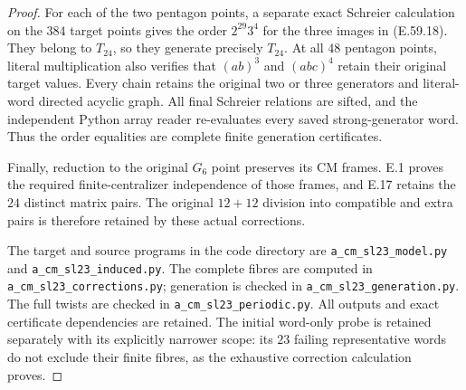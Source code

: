 \begin{proof}
For each of the two pentagon points, a separate exact Schreier
calculation on the $384$ target points gives the order
$2^{29}3^4$ for the three images in \textup{(E.59.18)}.
They belong to $T_{24}$, so they generate precisely $T_{24}$.
At all $48$ pentagon points, literal multiplication also verifies
that $(ab)^3$ and $(abc)^4$ retain their original target values.
Every chain retains the original two or three generators and
literal-word directed acyclic graph. All final Schreier relations
are sifted, and the independent Python array reader re-evaluates
every saved strong-generator word. Thus the order equalities
are complete finite generation certificates.

Finally, reduction to the original $G_6$ point preserves its
CM frames. E.1 proves the required finite-centralizer independence
of those frames, and E.17 retains the $24$ distinct matrix pairs.
The original $12+12$ division into compatible and extra pairs is
therefore retained by these actual corrections.

The target and source programs in the code directory are
\texttt{a\_cm\_sl23\_model.py} and
\texttt{a\_cm\_sl23\_induced.py}.
The complete fibres are computed in
\texttt{a\_cm\_sl23\_corrections.py}; generation is checked in
\texttt{a\_cm\_sl23\_generation.py}.
The full twists are checked in \texttt{a\_cm\_sl23\_periodic.py}.
All outputs and exact certificate dependencies are retained.
The initial word-only probe is retained separately with its
explicitly narrower scope: its $23$ failing representative words
do not exclude their finite fibres, as the exhaustive correction
calculation proves.
\end{proof}
